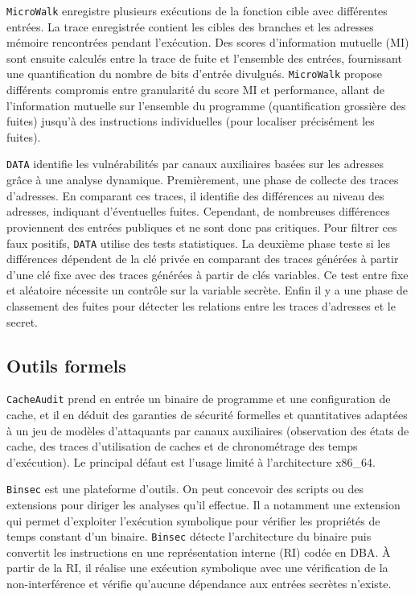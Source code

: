 \texttt{MicroWalk} enregistre plusieurs exécutions de la fonction cible avec différentes entrées. La trace enregistrée contient les cibles des branches et les adresses mémoire rencontrées pendant l’exécution. Des scores d’information mutuelle (MI) sont ensuite calculés entre la trace de fuite et l’ensemble des entrées, fournissant une quantification du nombre de bits d’entrée divulgués. \texttt{MicroWalk} propose différents compromis entre granularité du score MI et performance, allant de l’information mutuelle sur l’ensemble du programme (quantification grossière des fuites) jusqu’à des instructions individuelles (pour localiser précisément les fuites).\medbreak

\texttt{DATA} identifie les vulnérabilités par canaux auxiliaires basées sur les adresses grâce à une analyse dynamique. Premièrement, une phase de collecte des traces d’adresses. En comparant ces traces, il identifie des différences au niveau des adresses, indiquant d’éventuelles fuites. Cependant, de nombreuses différences proviennent des entrées publiques et ne sont donc pas critiques. Pour filtrer ces faux positifs, \texttt{DATA} utilise des tests statistiques. La deuxième phase teste si les différences dépendent de la clé privée en comparant des traces générées à partir d’une clé fixe avec des traces générées à partir de clés variables. Ce test entre fixe et aléatoire nécessite un contrôle sur la variable secrète. Enfin il y a une phase de classement des fuites pour détecter les relations entre les traces d’adresses et le secret.\medbreak


\subsection*{Outils formels}


\texttt{CacheAudit} prend en entrée un binaire de programme et une configuration de cache, et il en déduit des garanties de sécurité formelles et quantitatives adaptées à un jeu de modèles d'attaquants par canaux auxiliaires (observation des états de cache, des traces d'utilisation de caches et de chronométrage des temps d’exécution). Le principal défaut est l'usage limité à l'architecture x86\_64.\medbreak


\texttt{Binsec} est une plateforme d'outils. On peut concevoir des scripts ou des extensions pour diriger les analyses qu'il effectue. Il a notamment une extension qui permet d'exploiter l'exécution symbolique pour vérifier les propriétés de temps constant d'un binaire. \texttt{Binsec} détecte l'architecture du binaire puis convertit les instructions en une représentation interne (RI) codée en DBA. À partir de la RI, il réalise une exécution symbolique avec une vérification de la non-interférence et vérifie qu'aucune dépendance aux entrées secrètes n'existe.\medbreak

